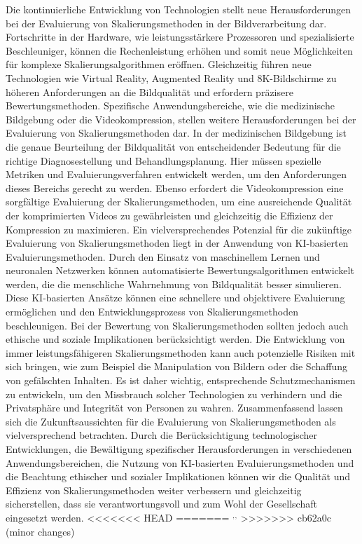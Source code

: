         Die kontinuierliche Entwicklung von Technologien stellt neue Herausforderungen bei der Evaluierung von Skalierungsmethoden in der Bildverarbeitung dar.
        Fortschritte in der Hardware, wie leistungsstärkere Prozessoren und spezialisierte Beschleuniger, können die Rechenleistung erhöhen und somit neue Möglichkeiten für komplexe Skalierungsalgorithmen eröffnen. Gleichzeitig führen neue Technologien wie Virtual Reality, Augmented Reality und 8K-Bildschirme zu höheren Anforderungen an die Bildqualität und erfordern präzisere Bewertungsmethoden.
        Spezifische Anwendungsbereiche, wie die medizinische Bildgebung oder die Videokompression, stellen weitere Herausforderungen bei der Evaluierung von Skalierungsmethoden dar. 
        In der medizinischen Bildgebung ist die genaue Beurteilung der Bildqualität von entscheidender Bedeutung für die richtige Diagnosestellung und Behandlungsplanung. 
        Hier müssen spezielle Metriken und Evaluierungsverfahren entwickelt werden, um den Anforderungen dieses Bereichs gerecht zu werden. 
        Ebenso erfordert die Videokompression eine sorgfältige Evaluierung der Skalierungsmethoden, um eine ausreichende Qualität der komprimierten Videos zu gewährleisten und gleichzeitig die Effizienz der Kompression zu maximieren.
        Ein vielversprechendes Potenzial für die zukünftige Evaluierung von Skalierungsmethoden liegt in der Anwendung von KI-basierten Evaluierungsmethoden. 
        Durch den Einsatz von maschinellem Lernen und neuronalen Netzwerken können automatisierte Bewertungsalgorithmen entwickelt werden, die die menschliche Wahrnehmung von Bildqualität besser simulieren. 
        Diese KI-basierten Ansätze können eine schnellere und objektivere Evaluierung ermöglichen und den Entwicklungsprozess von Skalierungsmethoden beschleunigen.
        Bei der Bewertung von Skalierungsmethoden sollten jedoch auch ethische und soziale Implikationen berücksichtigt werden. 
        Die Entwicklung von immer leistungsfähigeren Skalierungsmethoden kann auch potenzielle Risiken mit sich bringen, wie zum Beispiel die Manipulation von Bildern oder die Schaffung von gefälschten Inhalten. 
        Es ist daher wichtig, entsprechende Schutzmechanismen zu entwickeln, um den Missbrauch solcher Technologien zu verhindern und die Privatsphäre und Integrität von Personen zu wahren.
        Zusammenfassend lassen sich die Zukunftsaussichten für die Evaluierung von Skalierungsmethoden als vielversprechend betrachten. 
        Durch die Berücksichtigung technologischer Entwicklungen, die Bewältigung spezifischer Herausforderungen in verschiedenen Anwendungsbereichen, die Nutzung von KI-basierten Evaluierungsmethoden und die Beachtung ethischer und sozialer Implikationen können wir die Qualität und Effizienz von Skalierungsmethoden weiter verbessern und gleichzeitig sicherstellen, dass sie verantwortungsvoll und zum Wohl der Gesellschaft eingesetzt werden.
<<<<<<< HEAD
=======
        $^{,}$$^{,}$
>>>>>>> cb62a0c (minor changes)
\newpage